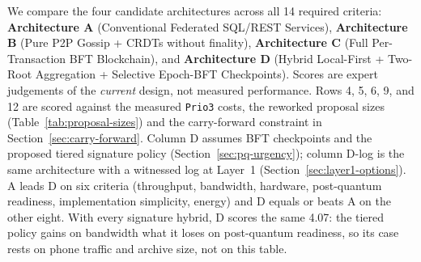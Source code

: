 \documentclass[10pt,twoside,openany]{book}
\theoremstyle{dpepstyle}
\begin{document}
We compare the four candidate architectures across all 14 required criteria: \textbf{Architecture A} (Conventional Federated SQL/REST Services), \textbf{Architecture B} (Pure P2P Gossip + CRDTs without finality), \textbf{Architecture C} (Full Per-Transaction BFT Blockchain), and \textbf{Architecture D} (Hybrid Local-First + Two-Root Aggregation + Selective Epoch-BFT Checkpoints). Scores are expert judgements of the \emph{current} design, not measured performance. Rows 4, 5, 6, 9, and 12 are scored against the measured \texttt{Prio3} costs, the reworked proposal sizes (Table~\ref{tab:proposal-sizes}) and the carry-forward constraint in Section~\ref{sec:carry-forward}. Column D assumes BFT checkpoints and the proposed tiered signature policy (Section~\ref{sec:pq-urgency}); column D-log is the same architecture with a witnessed log at Layer~1 (Section~\ref{sec:layer1-options}). A leads D on six criteria (throughput, bandwidth, hardware, post-quantum readiness, implementation simplicity, energy) and D equals or beats A on the other eight. With every signature hybrid, D scores the same 4.07: the tiered policy gains on bandwidth what it loses on post-quantum readiness, so its case rests on phone traffic and archive size, not on this table.
\end{document}
